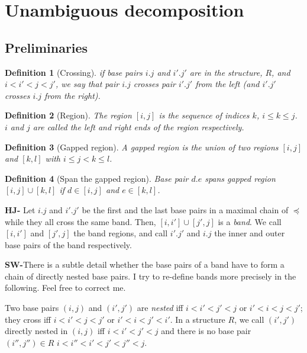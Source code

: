 \documentclass[11pt]{article} %
\newtheorem{definition}{Definition}
\newcommand{\SW}[1]{\textbf{SW-}#1}
\begin{document}
\section{Unambiguous decomposition}

\subsection{Preliminaries}

\begin{definition}[Crossing]
if base pairs $i.j$ and $i'.j'$ are in the structure, $R$, and $i<i'<j<j'$, we say that pair $i.j$ crosses pair $i'.j'$ from the left (and $i'.j'$ crosses $i.j$ from the right).
\end{definition}

\begin{definition}[Region] 
The \emph{region $[i,j]$} is the sequence of indices $k$, $i\leq k\leq j$.
$i$ and $j$ are called the left and right ends of the region respectively. 
\end{definition}

\begin{definition}[Gapped region]
A gapped region is the union of two regions $[i, j]$ and $[k, l]$ with $i \le j<k \le l$.
\end{definition}

\begin{definition}[Span the gapped region]
Base pair $d.e$ spans gapped region $[i, j] \cup [k, l]$ if $d \in [i, j]$ and $e \in [k, l]$.

\end{definition}

\textbf{HJ-}  Let $i.j$ and $i'.j'$ be the first and the last base pairs in a maximal 
chain of $\preceq$ while they all cross the same band. Then, $[i,i'] \cup [j',j]$ is a \emph{band}. 
We call $[i,i']$ and $[j',j]$ the band regions, 
and call $i'.j'$ and $i.j$ the inner and outer base pairs of the band respectively.

\SW{There is a subtle detail whether the base pairs of a band have to form a chain of directly nested base pairs. I try to re-define bands more precisely in the following. Feel free to correct me.}

Two base pairs $(i,j)$ and $(i',j')$ are \emph{nested} iff $i<i'<j'<j$ or $i'<i<j<j'$; they cross iff $i<i'<j<j'$ or $i'<i<j'<i'$. In a structure $R$, we call $(i',j')$ directly nested in $(i,j)$ iff $i<i'<j'<j$ and there is no base pair $(i'',j'')\in R$  $i<i''<i'<j'<j''<j$.
\end{document}
